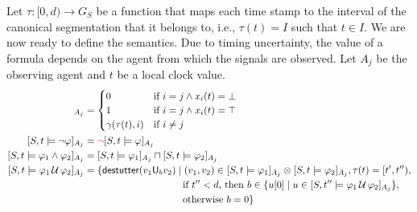 Let $\tau : [0,d) \to G_S$ be a function that maps each time stamp to the interval of the canonical segmentation that it belongs to, i.e., $\tau(t) = I$ such that $t \in I$.
We are now ready to define the semantics.
Due to timing uncertainty, the value of a formula depends on the agent from which the signals are observed.
Let $A_j$ be the observing agent and $t$ be a local clock value.
\begin{align*}
	[S,t \models p_i]_{A_j} &= \begin{cases}
		0 &\text{if } i = j \land x_i(t) = \bot \\
		1 &\text{if } i = j \land x_i(t) = \top \\
	 	\gamma(\tau(t), i) &\text{if } i \neq j
	\end{cases} \\
	[S,t \models \lnot \varphi]_{A_j} &= \alert{\lnot} [S,t \models \varphi]_{A_j} \\
	[S,t \models \varphi_1 \land \varphi_2]_{A_j} &= [S,t \models \varphi_1]_{A_j} \sqcap [S,t \models \varphi_2]_{A_j} \\
	[S,t \models \varphi_1 \until \varphi_2]_{A_j} &= \{ \destutter(v_1 \mathsf{U}_{b} v_2) \st (v_1,v_2) \in [S,t \models \varphi_1]_{A_j} \otimes [S,t \models \varphi_2]_{A_j}, \tau(t) = [t',t''),\\ 
	&\hspace{10em} \text{if $t'' < d$, then } b \in \{ u[0] \st u \in [S,t'' \models \varphi_1 \until \varphi_2]_{A_j} \}, \\
	&\hspace{10em} \text{otherwise } b = 0 \} 
\end{align*} 


